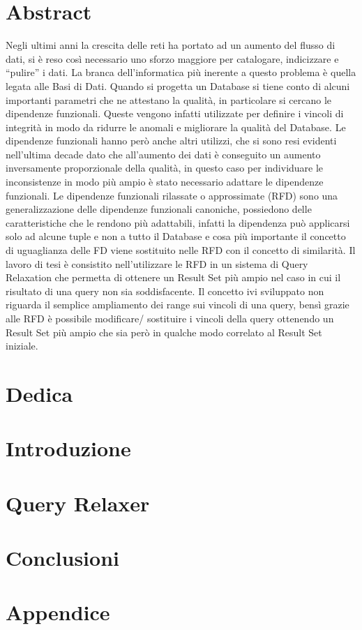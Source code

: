 \documentclass[12pt,oneside]{report}
\begin{document}

\chapter{Abstract}
Negli ultimi anni la crescita delle reti ha portato ad un aumento del flusso di dati, si è reso così necessario uno sforzo maggiore per catalogare, indicizzare e “pulire” i  dati. 
La branca dell’informatica più inerente a questo problema è quella legata alle Basi di Dati. 
Quando si progetta un Database si tiene conto di alcuni importanti parametri che ne attestano la qualità, in particolare si cercano le dipendenze funzionali. Queste vengono infatti utilizzate per definire i vincoli di integrità in modo da ridurre le anomali e migliorare la qualità del Database.
Le dipendenze funzionali hanno però anche altri utilizzi, che si sono resi evidenti nell’ultima decade dato che all’aumento dei dati è conseguito un aumento inversamente proporzionale della qualità, in questo caso per individuare le inconsistenze in modo più ampio è stato necessario adattare le dipendenze funzionali.
Le dipendenze funzionali rilassate o approssimate (RFD) sono una generalizzazione delle dipendenze funzionali canoniche, possiedono delle caratteristiche che le rendono più adattabili, infatti la dipendenza può applicarsi solo ad alcune tuple e non a tutto il Database e cosa più importante il concetto di uguaglianza delle FD viene sostituito nelle RFD con il concetto di similarità. 
Il lavoro di tesi è consistito nell’utilizzare le RFD in un sistema di Query Relaxation che permetta di ottenere un Result Set più ampio nel caso in cui il risultato di una query non sia soddisfacente.
Il concetto ivi sviluppato non riguarda il semplice ampliamento dei range sui vincoli di una query, bensì grazie alle RFD è possibile modificare/ sostituire i vincoli della query ottenendo un Result Set più ampio che sia però in qualche modo correlato al Result Set iniziale.

\chapter*{Dedica}


\tableofcontents

\chapter{Introduzione}


\chapter{Query Relaxer}


\chapter{Conclusioni}


\appendix
\chapter{Appendice}


\listoffigures
\listoftables
\renewcommand\listoflistingscaption{Elenco degli snippet di codice}
\listoflistings


\end{document}
